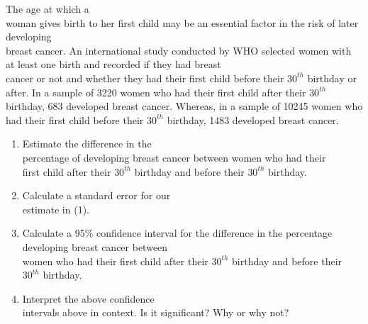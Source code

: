 \documentclass[11pt]{book}\usepackage[]{graphicx}\usepackage[]{color}
\begin{document}
\begin{exercises}
  \begin{exercise} %

The age at which a \\ woman gives birth to her first child may be an   essential factor in the risk of later  developing \\ breast cancer.  An international study conducted by WHO selected women  with at least one birth and recorded if they had breast \\ cancer or not and whether they had their first child before their $30^{th}$ birthday or after. In a sample of 3220 women who had their first child after their $30^{th}$ birthday, 683 developed breast cancer.  Whereas, in a sample of 10245 women who had their first child before their $30^{th}$ birthday, 1483 developed breast  cancer.

	  \begin{enumerate}
	  \item Estimate the difference in the \\ percentage of developing breast cancer  between  women who had their \\ first  child after their $30^{th}$ birthday and before their  $30^{th}$ birthday.
    \item Calculate a standard error for our \\ estimate in (1).
    \item Calculate a 95\% confidence interval for the difference in the percentage \\ developing breast cancer  between   \\ women who had their first  child after their $30^{th}$  birthday and before their \\ $30^{th}$ birthday.
    \item Interpret the above confidence \\ intervals above in context.  Is it significant? Why or why not?
	  \end{enumerate}
  \end{exercise}
  \begin{solution}  %


\end{solution}
\end{exercises}
\end{document}
